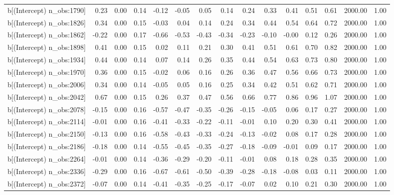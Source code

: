 \begin{table}[ht]
\begin{tabular}{rrrrrrrrrrrrrrr}
  b[(Intercept) n\_obs:1790] & 0.23 & 0.00 & 0.14 & -0.12 & -0.05 & 0.05 & 0.14 & 0.24 & 0.33 & 0.41 & 0.51 & 0.61 & 2000.00 & 1.00 \\ 
  b[(Intercept) n\_obs:1826] & 0.34 & 0.00 & 0.15 & -0.03 & 0.04 & 0.14 & 0.24 & 0.34 & 0.44 & 0.54 & 0.64 & 0.72 & 2000.00 & 1.00 \\ 
  b[(Intercept) n\_obs:1862] & -0.22 & 0.00 & 0.17 & -0.66 & -0.53 & -0.43 & -0.34 & -0.23 & -0.10 & -0.00 & 0.12 & 0.26 & 2000.00 & 1.00 \\ 
  b[(Intercept) n\_obs:1898] & 0.41 & 0.00 & 0.15 & 0.02 & 0.11 & 0.21 & 0.30 & 0.41 & 0.51 & 0.61 & 0.70 & 0.82 & 2000.00 & 1.00 \\ 
  b[(Intercept) n\_obs:1934] & 0.44 & 0.00 & 0.14 & 0.07 & 0.14 & 0.26 & 0.35 & 0.44 & 0.54 & 0.63 & 0.73 & 0.80 & 2000.00 & 1.00 \\ 
  b[(Intercept) n\_obs:1970] & 0.36 & 0.00 & 0.15 & -0.02 & 0.06 & 0.16 & 0.26 & 0.36 & 0.47 & 0.56 & 0.66 & 0.73 & 2000.00 & 1.00 \\ 
  b[(Intercept) n\_obs:2006] & 0.34 & 0.00 & 0.14 & -0.05 & 0.05 & 0.16 & 0.25 & 0.34 & 0.42 & 0.51 & 0.62 & 0.71 & 2000.00 & 1.00 \\ 
  b[(Intercept) n\_obs:2042] & 0.67 & 0.00 & 0.15 & 0.26 & 0.37 & 0.47 & 0.56 & 0.66 & 0.77 & 0.86 & 0.96 & 1.07 & 2000.00 & 1.00 \\ 
  b[(Intercept) n\_obs:2078] & -0.15 & 0.00 & 0.16 & -0.57 & -0.47 & -0.35 & -0.26 & -0.15 & -0.05 & 0.06 & 0.17 & 0.27 & 2000.00 & 1.00 \\ 
  b[(Intercept) n\_obs:2114] & -0.01 & 0.00 & 0.16 & -0.41 & -0.33 & -0.22 & -0.11 & -0.01 & 0.10 & 0.20 & 0.30 & 0.41 & 2000.00 & 1.00 \\ 
  b[(Intercept) n\_obs:2150] & -0.13 & 0.00 & 0.16 & -0.58 & -0.43 & -0.33 & -0.24 & -0.13 & -0.02 & 0.08 & 0.17 & 0.28 & 2000.00 & 1.00 \\ 
  b[(Intercept) n\_obs:2186] & -0.18 & 0.00 & 0.14 & -0.55 & -0.45 & -0.35 & -0.27 & -0.18 & -0.09 & -0.01 & 0.09 & 0.17 & 2000.00 & 1.00 \\ 
  b[(Intercept) n\_obs:2264] & -0.01 & 0.00 & 0.14 & -0.36 & -0.29 & -0.20 & -0.11 & -0.01 & 0.08 & 0.18 & 0.28 & 0.35 & 2000.00 & 1.00 \\ 
  b[(Intercept) n\_obs:2336] & -0.29 & 0.00 & 0.16 & -0.67 & -0.61 & -0.50 & -0.39 & -0.28 & -0.18 & -0.08 & 0.03 & 0.11 & 2000.00 & 1.00 \\ 
  b[(Intercept) n\_obs:2372] & -0.07 & 0.00 & 0.14 & -0.41 & -0.35 & -0.25 & -0.17 & -0.07 & 0.02 & 0.10 & 0.21 & 0.30 & 2000.00 & 1.00 \\ 

\end{tabular}
\end{table}
